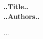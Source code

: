 \documentclass[11pt, letterpaper]{article}
\begin{document}
\begin{center}
    \large\textbf{..Title..\\
                  ..Authors..}
\end{center}

...
\end{document}
